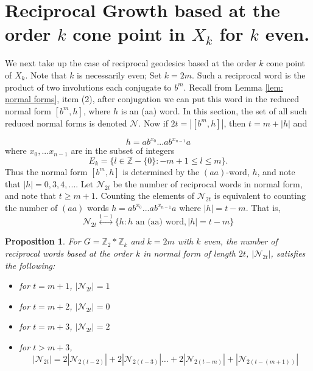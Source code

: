 \documentclass[11pt]{amsart}
\numberwithin{equation}{section}
\theoremstyle{plain}
\newtheorem{prop}[thm]{Proposition}
\begin{document}
\section{Reciprocal Growth  based at the order $k$ 
cone point  in $X_k$ for $k$ even.}
\label{sec: rec. growth based at order k}

We next take up the case of reciprocal geodesics based at the order $k$ cone point of $X_{k}$. Note that  $k$ is necessarily even; Set $k=2m$.  
   Such a reciprocal word is the product of two involutions each conjugate to $b^{m}$. Recall from Lemma \ref{lem: normal forms}, item (2), 
after conjugation we can put this word in 
   the reduced normal form $[b^{m},h]$, where $h$ is an (aa) word. In this section, the set of all such reduced normal forms is denoted $\mathcal{N}$. Now if $2t=|[b^{m},h]|$, then $t=m+|h|$ and 
   
\begin{equation}\label{eq: normal form for reciprocal based at order k}
h=ab^{x_0}...ab^{x_{n-1}}a
\end{equation}
where $x_0,...x_{n-1}$ are in the subset of integers 
\begin{displaymath}
E_k=\{l  \in \mathbb{Z}-\{0\} : -m+1 \leq l \leq m \}.
\end{displaymath}
 Thus the  normal form $[b^{m},h]$  is determined by the $(aa)$-word, $h$, and note that $|h|=0,3,4,...$.
Let $\mathcal{N}_{2t}$ be the number of reciprocal words in normal form, and note that $t \geq m+1$. Counting the elements of $\mathcal{N}_{2t}$ is equivalent to counting the number of $(aa)$ words $h=ab^{x_0}...ab^{x_{n-1}}a$ where 
$|h|=t-m$.  That is,
$$
\mathcal{N}_{2t} \overset{1-1}{\longleftrightarrow}
 \{h: h \text{ an (aa) word}, |h|=t-m\}
$$


\begin{prop}\label{thm:recurrence relation even k based at order k}
	For $G=\mathbb{Z}_{2} * \mathbb{Z}_{k}$ and $k=2m$ with $k$ even, the number of reciprocal words  based at the order $k$ in normal form of length $2t$, 
	$|\mathcal{N}_{2t}|$, satisfies the following:
	\begin{itemize}
		\item [(i)]  for $t = m + 1$, $|\mathcal{N}_{2t}| =1$
		\item [(ii)]  for $t = m + 2$, $|\mathcal{N}_{2t}| = 0$
		\item [(iii)]  for $t = m + 3$, $|\mathcal{N}_{2t}| = 2$
		\item [(iv)]  for $t > m + 3$, 
	\begin{equation}\label{eq: recurrence for rec. word based at k}
	|\mathcal{N}_{2t}| = 2|\mathcal{N}_{2(t-2)}|  + 2|\mathcal{N}_{2(t-3)}|  \dots + 
2|\mathcal{N}_{2(t-m)}| + |\mathcal{N}_{2(t-(m+1))}|
\end{equation}
		
	\end{itemize}
\end{prop}
\end{document}
